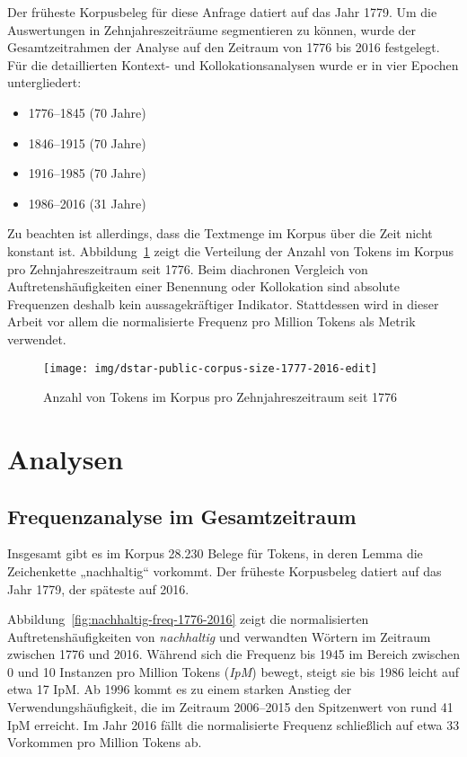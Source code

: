 \documentclass[
    german,
    a4paper,%
    12pt,%
    oneside,%
    toc=bibliography,
    final,
]{scrartcl}
\begin{document}
Der früheste Korpusbeleg für diese Anfrage datiert auf das Jahr 1779. Um die Auswertungen in Zehnjahreszeiträume segmentieren zu können, wurde der Gesamtzeitrahmen der Analyse auf den Zeitraum von 1776 bis 2016 festgelegt. Für die detaillierten Kontext- und Kollokationsanalysen wurde er in vier Epochen untergliedert:

\begin{itemize}
\item 1776–1845 (70 Jahre)
\item 1846–1915 (70 Jahre)
\item 1916–1985 (70 Jahre)
\item 1986–2016 (31 Jahre)
\end{itemize}

Zu beachten ist allerdings, dass die Textmenge im Korpus über die Zeit nicht konstant ist. Abbildung~\ref{fig:corpus-size} zeigt die Verteilung der Anzahl von Tokens im Korpus pro Zehnjahreszeitraum seit 1776. Beim diachronen Vergleich von Auftretenshäufigkeiten einer Benennung oder Kollokation sind absolute Frequenzen deshalb kein aussagekräftiger Indikator. Stattdessen wird in dieser Arbeit vor allem die normalisierte Frequenz pro Million Tokens als Metrik verwendet.

\begin{figure}[h!]
\centering
\texttt{[image: img/dstar-public-corpus-size-1777-2016-edit]}
\caption[corpus-size]{Anzahl von Tokens im Korpus pro Zehnjahreszeitraum seit 1776\footnotemark}
\label{fig:corpus-size}
\end{figure}


\section{Analysen}
\label{sec:analysen}


\subsection{Frequenzanalyse im Gesamtzeitraum}
\label{subsec:freq-gesamt}

Insgesamt gibt es im Korpus 28.230 Belege für Tokens, in deren Lemma die Zeichenkette „nachhaltig“ vorkommt. Der früheste Korpusbeleg datiert auf das Jahr 1779, der späteste auf 2016.

Abbildung~\ref{fig:nachhaltig-freq-1776-2016} zeigt die normalisierten Auftretenshäufigkeiten von \textit{nachhaltig} und verwandten Wörtern im Zeitraum zwischen 1776 und 2016. Während sich die Frequenz bis 1945 im Bereich zwischen 0 und 10 Instanzen pro Million Tokens (\textit{IpM}) bewegt, steigt sie bis 1986 leicht auf etwa 17 IpM. Ab 1996 kommt es zu einem starken Anstieg der Verwendungshäufigkeit, die im Zeitraum 2006–2015 den Spitzenwert von rund 41 IpM erreicht. Im Jahr 2016 fällt die normalisierte Frequenz schließlich auf etwa 33 Vorkommen pro Million Tokens ab.
\end{document}
